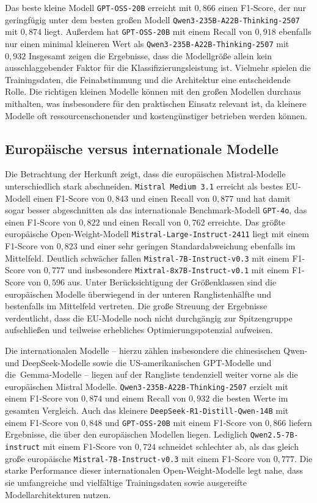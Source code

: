 Das beste kleine Modell \texttt{GPT-OSS-20B} erreicht mit $0{,}866$ einen F1-Score, der nur geringfügig unter dem besten großen Modell \texttt{Qwen3-235B-A22B-Thinking-2507} mit $0{,}874$ liegt. Außerdem hat \texttt{GPT-OSS-20B} mit einem Recall von $0{,}918$ ebenfalls nur einen minimal kleineren Wert als \texttt{Qwen3-235B-A22B-Thinking-2507} mit $0{,}932$ Insgesamt zeigen die Ergebnisse, dass die Modellgröße allein kein ausschlaggebender Faktor für die Klassifizierungsleistung ist. Vielmehr spielen die Trainingsdaten, die Feinabstimmung und die Architektur eine entscheidende Rolle. Die richtigen kleinen Modelle können mit den großen Modellen durchaus mithalten, was insbesondere für den praktischen Einsatz relevant ist, da kleinere Modelle oft ressourcenschonender und kostengünstiger betrieben werden können.

\subsection*{Europäische versus internationale Modelle}

Die Betrachtung der Herkunft zeigt, dass die europäischen Mistral-Modelle unterschiedlich stark abschneiden. \texttt{Mistral Medium 3.1} erreicht als bestes \ac{EU}-Modell einen F1-Score von $0{,}843$ und einen Recall von $0{,}877$ und hat damit sogar besser abgeschnitten als das internationale Benchmark-Modell \texttt{GPT-4o}, das einen F1-Score von $0{,}822$ und einen Recall von $0{,}762$ erreichte. Das größte europäische Open-Weight-Modell \texttt{Mistral-Large-Instruct-2411} liegt mit einem F1-Score von $0{,}823$ und einer sehr geringen Standardabweichung ebenfalls im Mittelfeld. Deutlich schwächer fallen \texttt{Mistral-7B-Instruct-v0.3} mit einem F1-Score von $0{,}777$ und insbesondere \texttt{Mixtral-8x7B-Instruct-v0.1} mit einem F1-Score von $0{,}596$ aus. Unter Berücksichtigung der Größenklassen sind die europäischen Modelle überwiegend in der unteren Ranglistenhälfte und bestenfalls im Mittelfeld vertreten. Die große Streuung der Ergebnisse verdeutlicht, dass die \ac{EU}-Modelle noch nicht durchgängig zur Spitzengruppe aufschließen und teilweise erhebliches Optimierungspotenzial aufweisen.

Die internationalen Modelle – hierzu zählen insbesondere die chinesischen Qwen- und DeepSeek-Modelle sowie die US-amerikanischen GPT-Modelle und die\linebreak~Gemma-Modelle – liegen auf der Rangliste tendenziell weiter vorne als die europäischen Mistral Modelle. \texttt{Qwen3-235B-A22B-Thinking-2507} erzielt mit einem F1-Score von $0{,}874$ und einem Recall von $0{,}932$ die besten Werte im gesamten Vergleich. Auch das kleinere \texttt{DeepSeek-R1-Distill-Qwen-14B} mit einem F1-Score von $0{,}848$ und \texttt{GPT-OSS-20B} mit einem F1-Score von $0{,}866$ liefern Ergebnisse, die über den europäischen Modellen liegen. Lediglich \texttt{Qwen2.5-7B-instruct} mit einem F1-Score von $0{,}724$ schneidet schlechter ab, als das gleich große europäische \texttt{Mistral-7B-Instruct-v0.3} mit einem F1-Score von $0{,}777$. Die starke Performance dieser internationalen Open-Weight-Modelle legt nahe, dass sie umfangreiche und vielfältige Trainingsdaten sowie ausgereifte Modellarchitekturen nutzen.

